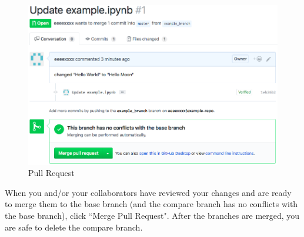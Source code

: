 \documentclass[11pt,a4paper]{article}
\begin{document}
\begin{figure}[h!]
\centering
\includegraphics[width=.7\textwidth]{figures/open_pull_request2.png}
\caption{Pull Request}
\label{fig:open-pull-request2}
\end{figure}

When you and/or your collaborators have reviewed your changes and are ready to merge them to the base branch (and the compare branch has no conflicts with the base branch), click ``Merge Pull Request".
After the branches are merged, you are safe to delete the compare branch.
\end{document}
